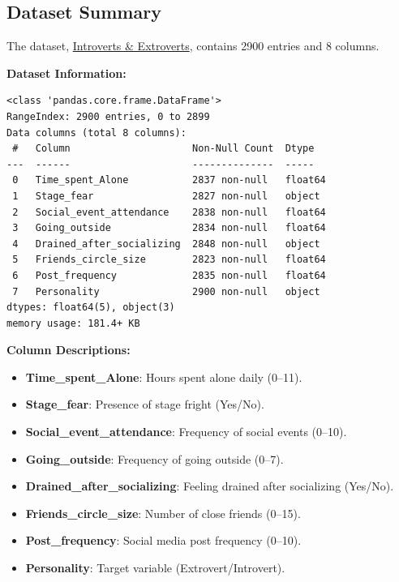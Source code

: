 \documentclass[
]{article}
\author{}
\date{}
\providecommand{\tightlist}{%
  \setlength{\itemsep}{0pt}\setlength{\parskip}{0pt}}
\begin{document}
\hypertarget{dataset-summary}{%
\subsection{Dataset Summary}\label{dataset-summary}}

The dataset,
\href{https://www.kaggle.com/datasets/rakeshkapilavai/extrovert-vs-introvert-behavior-data?resource=download}{Introverts
\& Extroverts}, contains 2900 entries and 8 columns.

\textbf{Dataset Information:}

\begin{verbatim}
<class 'pandas.core.frame.DataFrame'>
RangeIndex: 2900 entries, 0 to 2899
Data columns (total 8 columns):
 #   Column                     Non-Null Count  Dtype  
---  ------                     --------------  -----  
 0   Time_spent_Alone           2837 non-null   float64
 1   Stage_fear                 2827 non-null   object 
 2   Social_event_attendance    2838 non-null   float64
 3   Going_outside              2834 non-null   float64
 4   Drained_after_socializing  2848 non-null   object 
 5   Friends_circle_size        2823 non-null   float64
 6   Post_frequency             2835 non-null   float64
 7   Personality                2900 non-null   object 
dtypes: float64(5), object(3)
memory usage: 181.4+ KB
\end{verbatim}

\textbf{Column Descriptions:}

\begin{itemize}
\tightlist
\item
  \textbf{Time\_spent\_Alone}: Hours spent alone daily (0--11).
\item
  \textbf{Stage\_fear}: Presence of stage fright (Yes/No).
\item
  \textbf{Social\_event\_attendance}: Frequency of social events
  (0--10).
\item
  \textbf{Going\_outside}: Frequency of going outside (0--7).
\item
  \textbf{Drained\_after\_socializing}: Feeling drained after
  socializing (Yes/No).
\item
  \textbf{Friends\_circle\_size}: Number of close friends (0--15).
\item
  \textbf{Post\_frequency}: Social media post frequency (0--10).
\item
  \textbf{Personality}: Target variable (Extrovert/Introvert).
\end{itemize}
\end{document}
